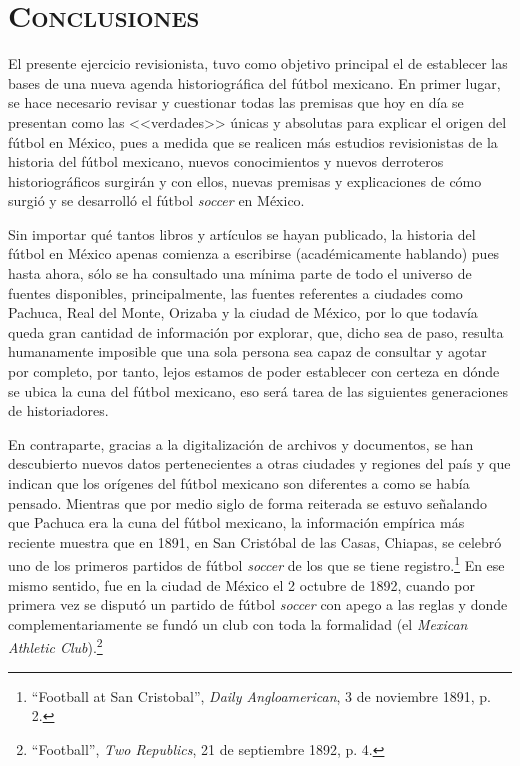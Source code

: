 \documentclass[11pt,a5paper,twoside]{book} %
\begin{document}
\chapter*{\centering\mdseries\Large\textsc{Conclusiones}}

\noindent El presente ejercicio revisionista, tuvo como objetivo principal el de establecer las bases de una nueva agenda historiográfica del fútbol mexicano. En primer lugar, se hace necesario revisar y cuestionar todas las premisas que hoy en día se presentan como las <<verdades>> únicas y absolutas para explicar el origen del fútbol en México, pues a medida que se realicen más estudios revisionistas de la historia del fútbol mexicano, nuevos conocimientos y nuevos derroteros historiográficos surgirán y con ellos, nuevas premisas y explicaciones de cómo surgió y se desarrolló el fútbol \emph{soccer} en México.

Sin importar qué tantos libros y artículos se hayan publicado, la historia del fútbol en México apenas comienza a escribirse (académicamente hablando) pues hasta ahora, sólo se ha consultado una mínima parte de todo el universo de fuentes disponibles, principalmente, las fuentes referentes a ciudades como Pachuca, Real del Monte, Orizaba y la ciudad de México, por lo que todavía queda gran cantidad de información por explorar, que, dicho sea de paso, resulta humanamente imposible que una sola persona sea capaz de consultar y agotar por completo, por tanto, lejos estamos de poder establecer con certeza en dónde se ubica la cuna del fútbol mexicano, eso será tarea de las siguientes generaciones de historiadores.

En contraparte, gracias a la digitalización de archivos y documentos, se han descubierto nuevos datos pertenecientes a otras ciudades y regiones del país y que indican que los orígenes del fútbol mexicano son diferentes a como se había pensado. Mientras que por medio siglo de forma reiterada se estuvo señalando que Pachuca era la cuna del fútbol mexicano, la información empírica más reciente muestra que en 1891, en San Cristóbal de las Casas, Chiapas, se celebró uno de los primeros partidos de fútbol \emph{soccer} de los que se tiene registro.\footnote{``Football at San Cristobal'', \emph{Daily Angloamerican}, 3 de noviembre 1891, p. 2.} En ese mismo sentido, fue en la ciudad de México el 2 octubre de 1892, cuando por primera vez se disputó un partido de fútbol \emph{soccer} con apego a las reglas y donde complementariamente se fundó un club con toda la formalidad (el \emph{Mexican Athletic Club}).\footnote{``Football'', \emph{Two Republics}, 21 de septiembre 1892, p. 4.}
\end{document}
